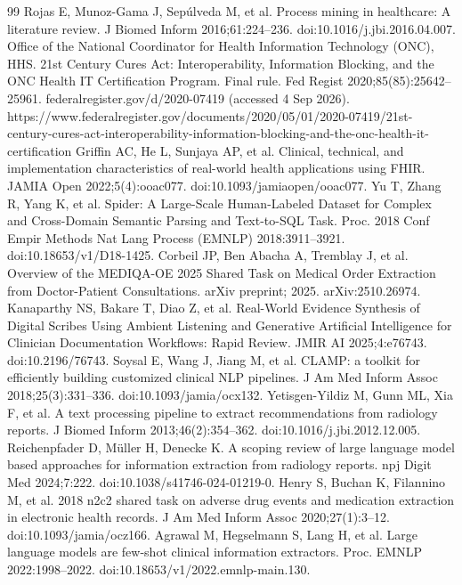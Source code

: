 \begin{thebibliography}{99}
\label{r28} Rojas E, Munoz-Gama J, Sepúlveda M, et al. Process mining in healthcare: A literature review. J Biomed Inform 2016;61:224--236. doi:10.1016/j.jbi.2016.04.007.
\label{r29} Office of the National Coordinator for Health Information Technology (ONC), HHS. 21st Century Cures Act: Interoperability, Information Blocking, and the ONC Health IT Certification Program. Final rule. Fed Regist 2020;85(85):25642--25961. federalregister.gov/d/2020-07419 (accessed 4 Sep 2026). https://www.federalregister.gov/documents/2020/05/01/2020-07419/21st-century-cures-act-interoperability-information-blocking-and-the-onc-health-it-certification
\label{r30} Griffin AC, He L, Sunjaya AP, et al. Clinical, technical, and implementation characteristics of real-world health applications using FHIR. JAMIA Open 2022;5(4):ooac077. doi:10.1093/jamiaopen/ooac077.
\label{r31} Yu T, Zhang R, Yang K, et al. Spider: A Large-Scale Human-Labeled Dataset for Complex and Cross-Domain Semantic Parsing and Text-to-SQL Task. Proc. 2018 Conf Empir Methods Nat Lang Process (EMNLP) 2018:3911--3921. doi:10.18653/v1/D18-1425.
\label{r32} Corbeil JP, Ben Abacha A, Tremblay J, et al. Overview of the MEDIQA-OE 2025 Shared Task on Medical Order Extraction from Doctor-Patient Consultations. arXiv preprint; 2025. arXiv:2510.26974.
\label{r33} Kanaparthy NS, Bakare T, Diao Z, et al. Real-World Evidence Synthesis of Digital Scribes Using Ambient Listening and Generative Artificial Intelligence for Clinician Documentation Workflows: Rapid Review. JMIR AI 2025;4:e76743. doi:10.2196/76743.
\label{r34} Soysal E, Wang J, Jiang M, et al. CLAMP: a toolkit for efficiently building customized clinical NLP pipelines. J Am Med Inform Assoc 2018;25(3):331--336. doi:10.1093/jamia/ocx132.
\label{r35} Yetisgen-Yildiz M, Gunn ML, Xia F, et al. A text processing pipeline to extract recommendations from radiology reports. J Biomed Inform 2013;46(2):354--362. doi:10.1016/j.jbi.2012.12.005.
\label{r36} Reichenpfader D, Müller H, Denecke K. A scoping review of large language model based approaches for information extraction from radiology reports. npj Digit Med 2024;7:222. doi:10.1038/s41746-024-01219-0.
\label{r37} Henry S, Buchan K, Filannino M, et al. 2018 n2c2 shared task on adverse drug events and medication extraction in electronic health records. J Am Med Inform Assoc 2020;27(1):3--12. doi:10.1093/jamia/ocz166.
\label{r38} Agrawal M, Hegselmann S, Lang H, et al. Large language models are few-shot clinical information extractors. Proc. EMNLP 2022:1998--2022. doi:10.18653/v1/2022.emnlp-main.130.

\end{thebibliography}
